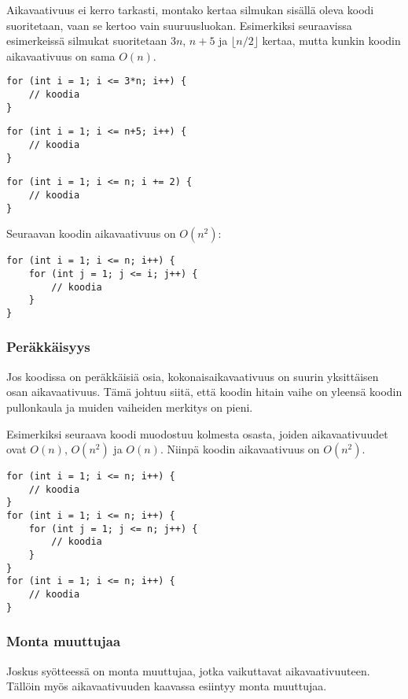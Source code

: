 Aikavaativuus ei kerro tarkasti,
montako kertaa silmukan sisällä oleva koodi suoritetaan,
vaan se kertoo vain suuruusluokan.
Esimerkiksi seuraavissa esimerkeissä silmukat
suoritetaan $3n$, $n+5$ ja $\lfloor n/2 \rfloor$ kertaa,
mutta kunkin koodin aikavaativuus on sama $O(n)$.

\begin{lstlisting}
for (int i = 1; i <= 3*n; i++) {
    // koodia
}
\end{lstlisting}

\begin{lstlisting}
for (int i = 1; i <= n+5; i++) {
    // koodia
}
\end{lstlisting}

\begin{lstlisting}
for (int i = 1; i <= n; i += 2) {
    // koodia
}
\end{lstlisting}

Seuraavan koodin aikavaativuus on $O(n^2)$:

\begin{lstlisting}
for (int i = 1; i <= n; i++) {
    for (int j = 1; j <= i; j++) {
        // koodia
    }
}
\end{lstlisting}

\subsubsection*{Peräkkäisyys}

Jos koodissa on peräkkäisiä osia,
kokonaisaikavaativuus on suurin yksittäisen
osan aikavaativuus.
Tämä johtuu siitä, että koodin hitain
vaihe on yleensä koodin pullonkaula
ja muiden vaiheiden merkitys on pieni.

Esimerkiksi seuraava koodi muodostuu
kolmesta osasta,
joiden aikavaativuudet ovat $O(n)$, $O(n^2)$ ja $O(n)$.
Niinpä koodin aikavaativuus on $O(n^2)$.

\begin{lstlisting}
for (int i = 1; i <= n; i++) {
    // koodia
}
for (int i = 1; i <= n; i++) {
    for (int j = 1; j <= n; j++) {
        // koodia
    }
}
for (int i = 1; i <= n; i++) {
    // koodia
}
\end{lstlisting}

\subsubsection*{Monta muuttujaa}

Joskus syötteessä on monta muuttujaa,
jotka vaikuttavat aikavaativuuteen.
Tällöin myös aikavaativuuden kaavassa esiintyy
monta muuttujaa.

